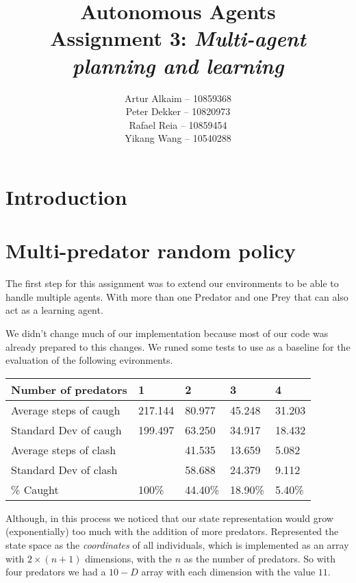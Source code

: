 \documentclass{article}
\begin{document}
\title{Autonomous Agents\\
Assignment 3: \emph{Multi-agent planning and learning}}
\author{
Artur Alkaim -- 10859368\\
Peter Dekker -- 10820973\\
Rafael Reia -- 10859454\\
Yikang Wang -- 10540288\\
}
\maketitle
\section{Introduction}

\section{Multi-predator random policy}
The first step for this assignment was to extend our environments to be able to
handle multiple agents. With more than one Predator and one Prey that can also
act as a learning agent.

We didn't change much of our implementation because most of our code was
already prepared to this changes. We runed some tests to use as a baseline for
the evaluation of the following evironments.

\begin{table}[h]
\centering
\begin{tabular}{|l|l|l|l|l|}
\hline
Number of predators    & 1       & 2       & 3       & 4      \\ \hline
Average steps of caugh & 217.144 & 80.977  & 45.248  & 31.203 \\ \hline
Standard Dev of caugh  & 199.497 & 63.250  & 34.917  & 18.432 \\ \hline
Average steps of clash &         & 41.535  & 13.659  & 5.082  \\ \hline
Standard Dev of clash  &         & 58.688  & 24.379  & 9.112  \\ \hline
\% Caught              & 100\%   & 44.40\% & 18.90\% & 5.40\% \\ \hline
\end{tabular}
\end{table}

Although, in this process we noticed that our state representation would grow
(exponentially) too much with the addition of more predators. Represented the
state space as the \emph{coordinates} of all individuals, which is implemented as
an array with $2 \times (n+1)$ dimensions, with the $n$ as the number of
predators. So with four predators we had a $10-D$ array with each dimension
with the value $11$.
\end{document}
